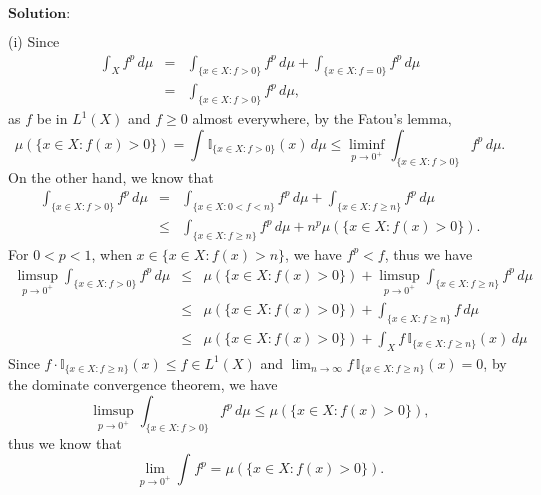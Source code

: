 \documentclass[12pt,a4paper]{ctexart}
\begin{document}
\vspace{8pt}
$\textbf{Solution:}$

(i) Since
\begin{eqnarray*}
    \int_{X}^{} f^{p} \, d \mu & = & \int_{\{x \in X: f > 0\}}^{} f^{p} \, d \mu + \int_{\{x \in X: f = 0\}}^{} f^{p} \, d \mu \\
    & = & \int_{\{x \in X: f > 0\}}^{} f^{p} \, d \mu,
\end{eqnarray*}
as $f$ be in $L^{1}(X)$ and $f \geq 0$ almost everywhere, by the Fatou's lemma,
\begin{equation*}
    \mu(\{x \in X:  f(x) > 0\}) = \int_{}^{} \mathbb{I}_{\{x \in X: f > 0\}} (x) \, d \mu \leq \liminf_{p \to 0^{+}} \int_{\{x \in X: f > 0\}}^{} f^{p} \, d \mu.
\end{equation*}
On the other hand, we know that
\begin{eqnarray*}
    \int_{\{x \in X: f > 0\}}^{} f^{p} \, d \mu & = & \int_{\{x \in X: 0 < f < n\}}^{} f^{p} \, d \mu  + \int_{\{x \in X: f \geq n\}}^{} f^{p} \, d \mu \\
    & \leq & \int_{\{x \in X: f \geq n\}}^{} f^{p} \, d \mu + n^{p} \mu(\{x \in X:  f(x) > 0\}).
\end{eqnarray*}
For $0 < p < 1$, when $x \in \{x \in X:  f(x) > n\}$, we have $f^{p} < f$, thus we have
\begin{eqnarray*}
    \limsup_{p \to 0^{+}} \int_{\{x \in X: f > 0\}}^{} f^{p} \, d \mu & \leq &  \mu(\{x \in X:  f(x) > 0\}) + \limsup_{p \to 0^{+}} \int_{\{x \in X: f \geq n\}}^{} f^{p} \, d \mu \\
    & \leq & \mu(\{x \in X:  f(x) > 0\}) + \int_{\{x \in X: f \geq n\}}^{} f \, d \mu \\
    & \leq & \mu(\{x \in X:  f(x) > 0\}) + \int_{X}^{} f \, \mathbb{I}_{\{x \in X: f \geq n\}}(x) \, d \mu
\end{eqnarray*}
Since $f \cdot \mathbb{I}_{\{x \in X: f \geq n\}}(x) \leq f \in L^{1}(X)$ and $\lim_{n \to \infty} f \, \mathbb{I}_{\{x \in X: f \geq n\}}(x) = 0 $, by the dominate convergence theorem, we have
\begin{equation*}
    \limsup_{p \to 0^{+}} \int_{\{x \in X: f > 0\}}^{} f^{p} \, d \mu \leq \mu(\{x \in X:  f(x) > 0\}),
\end{equation*}
thus we know that
\begin{equation*}
    \lim_{p \to 0^{+}} \int_{}^{} f^{p} = \mu(\{x \in X:  f(x) > 0\}).
\end{equation*}
\end{document}
